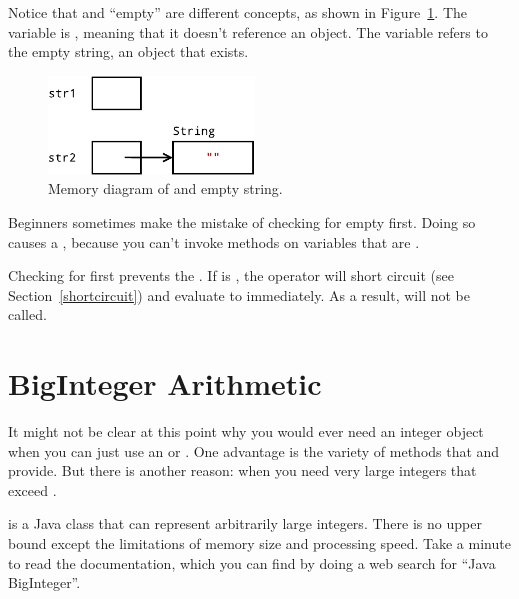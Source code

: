 Notice that  and ``empty'' are different concepts, as shown in Figure~\ref{fig.nullempty}.
The variable  is , meaning that it doesn't reference an object.
The variable  refers to the empty string, an object that exists.

\begin{figure}[!ht]
\begin{center}
\includegraphics[width=155pt]{figs/nullempty.pdf}
\caption{Memory diagram of  and empty string.}
\label{fig.nullempty}
\end{center}
\end{figure}

Beginners sometimes make the mistake of checking for empty first.
Doing so causes a , because you can't invoke methods on variables that are .

\begin{code}
if (str.isEmpty() || str == null) {    // wrong!
\end{code}


Checking for  first prevents the .
If  is , the \java{||} operator will short circuit (see Section~\ref{shortcircuit}) and evaluate to  immediately.
As a result,  will not be called.


\section{BigInteger Arithmetic}

It might not be clear at this point why you would ever need an integer object when you can just use an  or .
One advantage is the variety of methods that  and  provide.
But there is another reason: when you need very large integers that exceed .


 is a Java class that can represent arbitrarily large integers.
There is no upper bound except the limitations of memory size and processing speed.
Take a minute to read the documentation, which you can find by doing a web search for ``Java BigInteger''.


